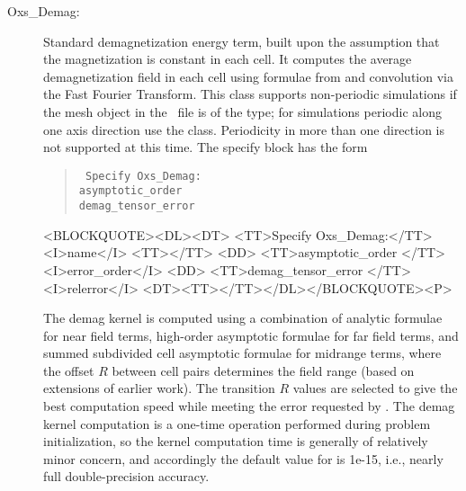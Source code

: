 \begin{description}
\item[Oxs\_Demag:]
%
   Standard demagnetization energy term, built upon
   the assumption that the magnetization is constant in each cell.
   It computes the average demagnetization field in each cell using
   formulae from \cite{aharoni1998,newell1993} and convolution
   via the Fast Fourier Transform.  This class supports non-periodic
   simulations if the mesh object in the \MIF\ file is of the
   type; for simulations periodic along one axis direction use the
   class.  Periodicity in more than one direction is not supported at
   this time.  The specify block has the form
   \begin{latexonly}
      \begin{quote}\tt
        Specify Oxs\_Demag: \ocb\\
        \bi asymptotic\_order \\
        \bi demag\_tensor\_error \\
      \ccb
      \end{quote}
   \end{latexonly}
   \begin{rawhtml}
   <BLOCKQUOTE><DL><DT>
   <TT>Specify Oxs_Demag:</TT><I>name</I> <TT>{</TT>
       <DD> <TT>asymptotic_order </TT><I>error_order</I>
       <DD> <TT>demag_tensor_error </TT><I>relerror</I>
   <DT><TT>}</TT></DL></BLOCKQUOTE><P>
   \end{rawhtml}
   The demag kernel is computed using a combination of analytic formulae
   for near field terms, high-order asymptotic formulae for far field
   terms, and summed subdivided cell asymptotic formulae for midrange
   terms, where the offset $R$ between cell pairs determines the field
   range (based on extensions of earlier work\cite{lebecki2008}).
   The transition $R$ values are selected to give the best computation
   speed while meeting the error requested by . The
   demag kernel computation is a one-time operation performed during
   problem initialization, so the kernel computation time is generally
   of relatively minor concern, and accordingly the default value for
    is 1e-15, i.e., nearly full double-precision
   accuracy.


\end{description}
